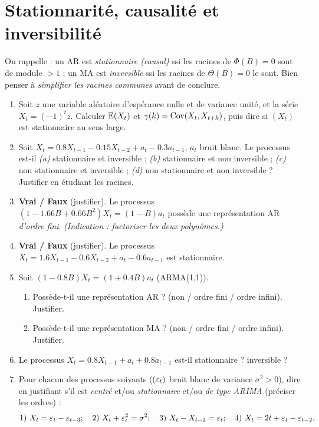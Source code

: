 \documentclass[11pt]{article}
\begin{document}
\section{Stationnarité, causalité et inversibilité}
\begin{contexte}
On rappelle : un AR est \emph{stationnaire (causal)} ssi les racines de $\Phi(B)=0$ sont de
module $>1$ ; un MA est \emph{inversible} ssi les racines de $\Theta(B)=0$ le sont.
Bien penser à \emph{simplifier les racines communes} avant de conclure.
\end{contexte}
\begin{enumerate}[label=\textbf{Q\,B.\arabic*},leftmargin=*]
\item Soit $z$ une variable aléatoire d'espérance nulle et de variance unité, et la série
$X_t=(-1)^t z$. Calculer $\mathbb{E}(X_t)$ et $\gamma(k)=\operatorname{Cov}(X_t,X_{t+k})$, puis dire si $(X_t)$ est
stationnaire au sens large.

\item Soit $X_t=0.8X_{t-1}-0.15X_{t-2}+a_t-0.3a_{t-1}$, $a_t$ bruit blanc. Le processus
est-il \emph{(a)} stationnaire et inversible ; \emph{(b)} stationnaire et non inversible ;
\emph{(c)} non stationnaire et inversible ; \emph{(d)} non stationnaire et non inversible ?
Justifier en étudiant les racines.

\item \textbf{Vrai / Faux} (justifier). Le processus $(1-1.66B+0.66B^2)X_t=(1-B)a_t$
possède une représentation AR \emph{d'ordre fini}. \emph{(Indication : factoriser les deux
polynômes.)}

\item \textbf{Vrai / Faux} (justifier). Le processus $X_t=1.6X_{t-1}-0.6X_{t-2}+a_t-0.6a_{t-1}$
est stationnaire.

\item Soit $(1-0.8B)X_t=(1+0.4B)a_t$ (ARMA(1,1)).
\begin{enumerate}[label=\alph*.,nosep]
  \item Possède-t-il une représentation AR ? (non / ordre fini / ordre infini). Justifier.
  \item Possède-t-il une représentation MA ? (non / ordre fini / ordre infini). Justifier.
\end{enumerate}

\item Le processus $X_t=0.8X_{t-1}+a_t+0.8a_{t-1}$ est-il stationnaire ? inversible ?

\item Pour chacun des processus suivants ($(\varepsilon_t)$ bruit blanc de variance $\sigma^2>0$),
dire en justifiant s'il est \emph{centré} et/ou \emph{stationnaire} et/ou \emph{de type ARIMA}
(préciser les ordres) :
\[
\text{1) }X_t=\varepsilon_t-\varepsilon_{t-3};\quad \text{2) }X_t+\varepsilon_t^2=\sigma^2;\quad
\text{3) }X_t-X_{t-2}=\varepsilon_t;\quad \text{4) }X_t=2t+\varepsilon_t-\varepsilon_{t-2}.
\]


\end{enumerate}
\end{document}
